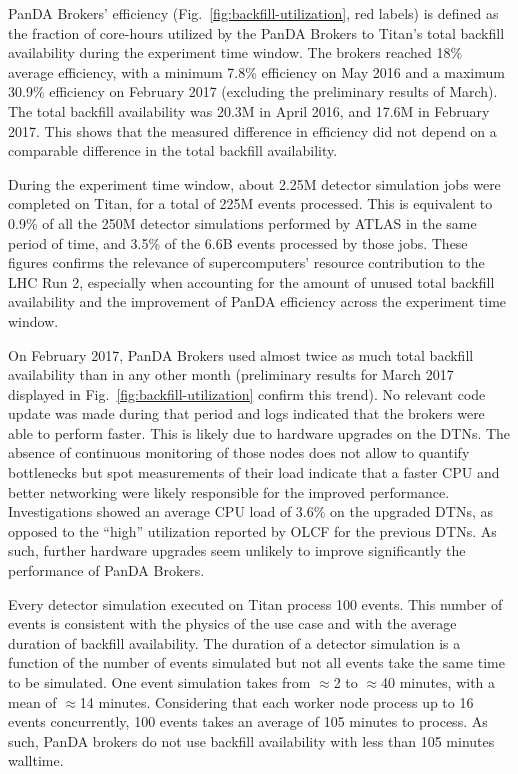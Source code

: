 PanDA Brokers' efficiency (Fig.~\ref{fig:backfill-utilization}, red labels)
is defined as the fraction of core-hours utilized by the PanDA Brokers to
Titan’s total backfill availability during the experiment time window. The
brokers reached 18\% average efficiency, with a minimum 7.8\% efficiency on
May 2016 and a maximum 30.9\% efficiency on February 2017 (excluding the
preliminary results of March). The total backfill availability was 20.3M in
April 2016, and 17.6M in February 2017. This shows that the measured
difference in efficiency did not depend on a comparable difference in the
total backfill availability.

During the experiment time window, about 2.25M detector simulation jobs were
completed on Titan, for a total of 225M events processed. This is equivalent
to 0.9\% of all the 250M detector simulations performed by ATLAS in the same
period of time, and 3.5\% of the 6.6B events processed by those jobs. These
figures confirms the relevance of supercomputers' resource contribution to
the LHC Run 2, especially when accounting for the amount of unused total
backfill availability and the improvement of PanDA efficiency across the
experiment time window.

On February 2017, PanDA Brokers used almost twice as much total backfill
availability than in any other month (preliminary results for March 2017
displayed in Fig.~\ref{fig:backfill-utilization} confirm this trend). No
relevant code update was made during that period and logs indicated that the
brokers were able to perform faster. This is likely due to hardware upgrades
on the DTNs. The absence of continuous monitoring of those nodes does not
allow to quantify bottlenecks but spot measurements of their load indicate
that a faster CPU and better networking were likely responsible for the
improved performance. Investigations showed an average CPU load of 3.6\% on
the upgraded DTNs, as opposed to the ``high'' utilization reported by OLCF
for the previous DTNs. As such, further hardware upgrades seem unlikely to
improve significantly the performance of PanDA Brokers.

Every detector simulation executed on Titan process 100 events. This number
of events is consistent with the physics of the use case and with the average
duration of backfill availability. The duration of a detector simulation is a
function of the number of events simulated but not all events take the same
time to be simulated. One event simulation takes from $\approx$2 to
$\approx$40 minutes, with a mean of $\approx$14 minutes. Considering that
each worker node process up to 16 events concurrently, 100 events takes an
average of 105 minutes to process. As such, PanDA brokers do not use backfill
availability with less than 105 minutes walltime.

